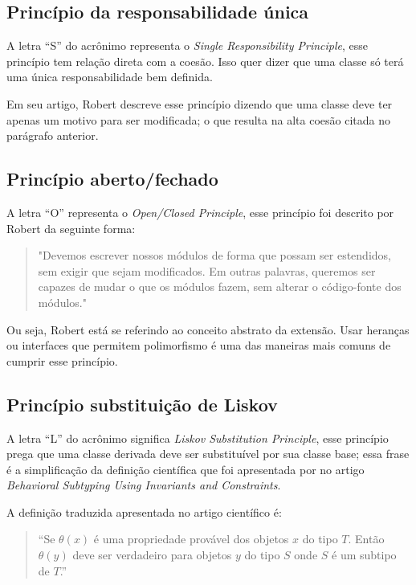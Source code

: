 \subsection{Princípio da responsabilidade única}
A letra “S” do acrônimo representa o \textit{Single Responsibility Principle}, esse princípio tem relação direta com a coesão. Isso quer dizer que uma classe só terá uma única responsabilidade bem definida.

Em seu artigo, Robert descreve esse princípio dizendo que uma classe deve ter apenas um motivo para ser modificada; o que resulta na alta coesão citada no parágrafo anterior.

\subsection{Princípio aberto/fechado}
A letra “O” representa o \textit{Open/Closed Principle}, esse princípio foi descrito por Robert da seguinte forma: 

\begin{quotation}
"Devemos escrever nossos módulos de forma que possam ser estendidos, sem exigir que sejam modificados. Em outras palavras, queremos ser capazes de mudar o que os módulos fazem, sem alterar o código-fonte dos módulos."
\end{quotation}

Ou seja, Robert está se referindo ao conceito abstrato da extensão. Usar heranças ou interfaces que permitem polimorfismo é uma das maneiras mais comuns de cumprir esse princípio.

\subsection{Princípio substituição de Liskov}\label{sec:liskov}
A letra “L” do acrônimo significa \textit{Liskov Substitution Principle}, esse princípio prega que uma classe derivada deve ser substituível por sua classe base; essa frase é a simplificação da definição científica que foi apresentada por \textcite{liskov} no artigo \textit{Behavioral Subtyping Using Invariants and Constraints}.

A definição traduzida apresentada no artigo científico é:

\begin{quotation}
“Se $\theta(x)$ é uma propriedade provável dos objetos $x$ do tipo $T$. Então $\theta(y)$ deve ser verdadeiro para objetos $y$ do tipo $S$ onde $S$ é um subtipo de $T$.”
\end{quotation}

